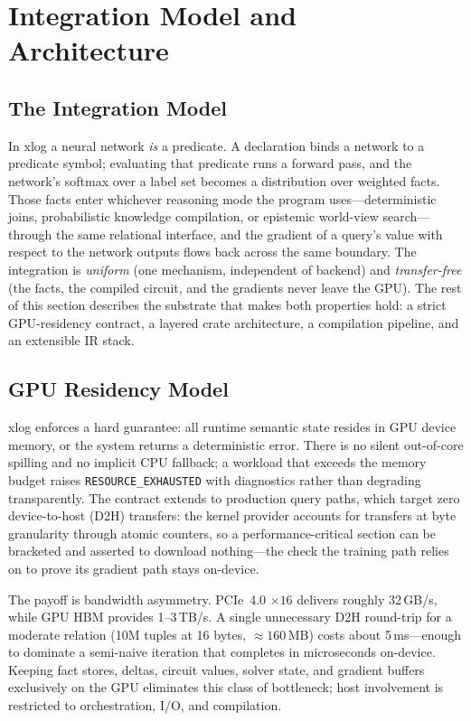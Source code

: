 \section{Integration Model and Architecture}\label{sec:arch}

\subsection{The Integration Model}

In xlog a neural network \emph{is} a predicate. A declaration binds a network to a predicate symbol; evaluating that predicate runs a forward pass, and the network's softmax over a label set becomes a distribution over weighted facts. Those facts enter whichever reasoning mode the program uses---deterministic joins, probabilistic knowledge compilation, or epistemic world-view search---through the same relational interface, and the gradient of a query's value with respect to the network outputs flows back across the same boundary. The integration is \emph{uniform} (one mechanism, independent of backend) and \emph{transfer-free} (the facts, the compiled circuit, and the gradients never leave the GPU). The rest of this section describes the substrate that makes both properties hold: a strict GPU-residency contract, a layered crate architecture, a compilation pipeline, and an extensible IR stack.

\subsection{GPU Residency Model}

xlog enforces a hard guarantee: all runtime semantic state resides in GPU device memory, or the system returns a deterministic error. There is no silent out-of-core spilling and no implicit CPU fallback; a workload that exceeds the memory budget raises \texttt{RESOURCE\_EXHAUSTED} with diagnostics rather than degrading transparently. The contract extends to production query paths, which target zero device-to-host (D2H) transfers: the kernel provider accounts for transfers at byte granularity through atomic counters, so a performance-critical section can be bracketed and asserted to download nothing---the check the training path relies on to prove its gradient path stays on-device.

The payoff is bandwidth asymmetry. PCIe~4.0 $\times16$ delivers roughly 32\,GB/s, while GPU HBM provides 1--3\,TB/s. A single unnecessary D2H round-trip for a moderate relation (10M tuples at 16 bytes, ${\approx}160$\,MB) costs about 5\,ms---enough to dominate a semi-naive iteration that completes in microseconds on-device. Keeping fact stores, deltas, circuit values, solver state, and gradient buffers exclusively on the GPU eliminates this class of bottleneck; host involvement is restricted to orchestration, I/O, and compilation.

